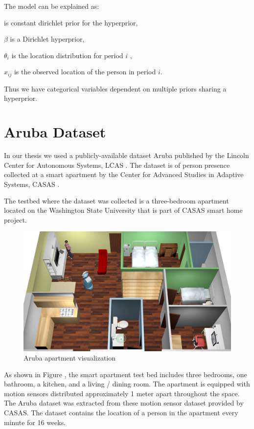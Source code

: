 The model can be explained as:

	\boldmath{$\alpha$} is  constant dirichlet prior for the hyperprior, 
	
	$\beta$ is a Dirichlet hyperprior,
	
	$\theta_i$ is the location distribution for period $i$  ,
	
	$x_{ij}$ is the observed location of the person in period $i$.
	
Thus we have categorical variables dependent on multiple priors sharing a hyperprior.


\section{Aruba Dataset}
In our thesis we used a  publicly-available  dataset  Aruba published by the Lincoln Center for Autonomous Systems, LCAS . The dataset is of person presence collected at a smart apartment by the Center for Advanced Studies in Adaptive Systems, CASAS .

The testbed where the dataset was collected is a  three-bedroom apartment located on the Washington State University that is part of CASAS smart home project. 
\begin{figure}[htp]
\centering
\includegraphics[width=\textwidth]{images/aruba-flat.png}
\caption{Aruba apartment visualization}
\label{aruba}
\end{figure}
As shown in Figure \cite{aruba}, the smart apartment test bed includes three bedrooms, one bathroom, a kitchen, and a living / dining room.  The apartment is equipped with motion sensors distributed approximately 1 meter apart throughout the space. The Aruba dataset was extracted from these motion sensor dataset provided by CASAS. The dataset contains the location of a person in the apartment every minute for 16 weeks.


